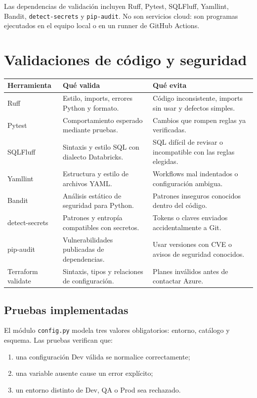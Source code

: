\documentclass[11pt,a4paper]{article}
\begin{document}
Las dependencias de validación incluyen Ruff, Pytest, SQLFluff, Yamllint, Bandit,
\texttt{detect-secrets} y \texttt{pip-audit}. No son servicios cloud: son programas ejecutados en el
equipo local o en un runner de GitHub Actions.

\section{Validaciones de código y seguridad}

\begin{longtable}{p{}p{}p{}}
\toprule
\textbf{Herramienta} & \textbf{Qué valida} & \textbf{Qué evita} \\
\midrule
\endhead
Ruff & Estilo, imports, errores Python y formato. & Código inconsistente, imports sin usar y defectos simples. \\
Pytest & Comportamiento esperado mediante pruebas. & Cambios que rompen reglas ya verificadas. \\
SQLFluff & Sintaxis y estilo SQL con dialecto Databricks. & SQL difícil de revisar o incompatible con las reglas elegidas. \\
Yamllint & Estructura y estilo de archivos YAML. & Workflows mal indentados o configuración ambigua. \\
Bandit & Análisis estático de seguridad para Python. & Patrones inseguros conocidos dentro del código. \\
detect-secrets & Patrones y entropía compatibles con secretos. & Tokens o claves enviados accidentalmente a Git. \\
pip-audit & Vulnerabilidades publicadas de dependencias. & Usar versiones con CVE o avisos de seguridad conocidos. \\
Terraform validate & Sintaxis, tipos y relaciones de configuración. & Planes inválidos antes de contactar Azure. \\
\bottomrule
\end{longtable}

\subsection{Pruebas implementadas}

El módulo \texttt{config.py} modela tres valores obligatorios: entorno, catálogo y esquema. Las pruebas
verifican que:

\begin{enumerate}
  \item una configuración Dev válida se normalice correctamente;
  \item una variable ausente cause un error explícito;
  \item un entorno distinto de Dev, QA o Prod sea rechazado.
\end{enumerate}
\end{document}
